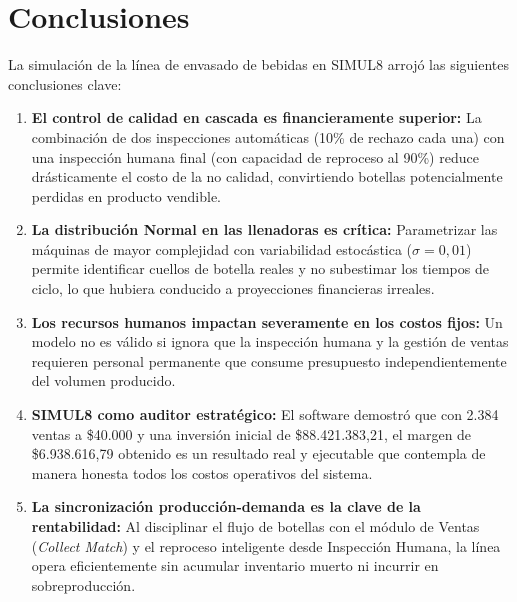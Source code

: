 \documentclass[12pt, a4paper]{article}
\begin{document}
\section{Conclusiones}
La simulación de la línea de envasado de bebidas en SIMUL8 arrojó las siguientes conclusiones clave:

\begin{enumerate}
    \item \textbf{El control de calidad en cascada es financieramente superior:} La combinación de dos inspecciones automáticas (10\% de rechazo cada una) con una inspección humana final (con capacidad de reproceso al 90\%) reduce drásticamente el costo de la no calidad, convirtiendo botellas potencialmente perdidas en producto vendible.
    \item \textbf{La distribución Normal en las llenadoras es crítica:} Parametrizar las máquinas de mayor complejidad con variabilidad estocástica ($\sigma = 0,01$) permite identificar cuellos de botella reales y no subestimar los tiempos de ciclo, lo que hubiera conducido a proyecciones financieras irreales.
    \item \textbf{Los recursos humanos impactan severamente en los costos fijos:} Un modelo no es válido si ignora que la inspección humana y la gestión de ventas requieren personal permanente que consume presupuesto independientemente del volumen producido.
    \item \textbf{SIMUL8 como auditor estratégico:} El software demostró que con 2.384 ventas a \$40.000 y una inversión inicial de \$88.421.383,21, el margen de \$6.938.616,79 obtenido es un resultado real y ejecutable que contempla de manera honesta todos los costos operativos del sistema.
    \item \textbf{La sincronización producción-demanda es la clave de la rentabilidad:} Al disciplinar el flujo de botellas con el módulo de Ventas (\textit{Collect Match}) y el reproceso inteligente desde Inspección Humana, la línea opera eficientemente sin acumular inventario muerto ni incurrir en sobreproducción.
\end{enumerate}
\end{document}
